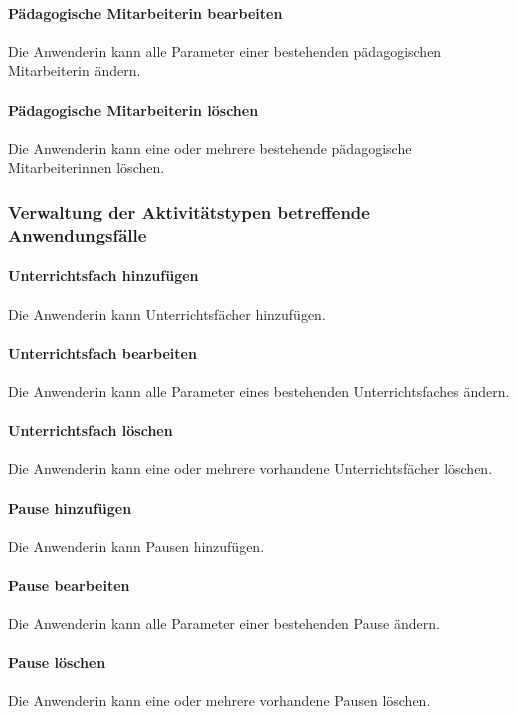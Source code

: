 \documentclass[fontsize=12pt,paper=a4,twoside]{scrartcl}
\begin{document}
\paragraph{Pädagogische Mitarbeiterin bearbeiten}
Die Anwenderin kann alle Parameter einer bestehenden pädagogischen Mitarbeiterin ändern.

\paragraph{Pädagogische Mitarbeiterin löschen}
Die Anwenderin kann eine oder mehrere bestehende pädagogische Mitarbeiterinnen löschen.

\subsubsection{Verwaltung der Aktivitätstypen betreffende Anwendungsfälle}

\paragraph{Unterrichtsfach hinzufügen}
Die Anwenderin kann Unterrichtsfächer hinzufügen.

\paragraph{Unterrichtsfach bearbeiten}
Die Anwenderin kann alle Parameter eines bestehenden Unterrichtsfaches ändern.

\paragraph{Unterrichtsfach löschen}
Die Anwenderin kann eine oder mehrere vorhandene Unterrichtsfächer löschen.

\paragraph{Pause hinzufügen}
Die Anwenderin kann Pausen hinzufügen.

\paragraph{Pause bearbeiten}
Die Anwenderin kann alle Parameter einer bestehenden Pause ändern.

\paragraph{Pause löschen}
Die Anwenderin kann eine oder mehrere vorhandene Pausen löschen.
\end{document}
